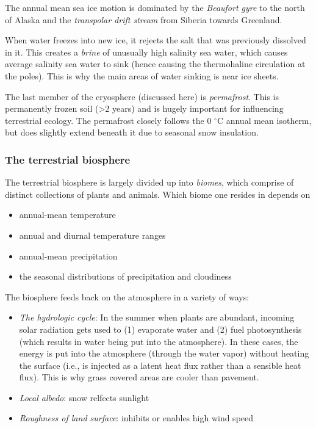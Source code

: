 \documentclass[11pt]{article}
\numberwithin{equation}{section}
\begin{document}
The annual mean sea ice motion is dominated by the \textit{Beaufort gyre} to the north of Alaska and the \textit{transpolar drift stream} from Siberia towards Greenland.

When water freezes into new ice, it rejects the salt that was previously dissolved in it. This creates a \textit{brine} of unusually high salinity sea water, which causes average salinity sea water to sink (hence causing the thermohaline circulation at the poles). This is why the main areas of water sinking is near ice sheets.

The last member of the cryosphere (discussed here) is \textit{permafrost}. This is permanently frozen soil (>2 years) and is hugely important for influencing terrestrial ecology. The permafrost closely follows the 0 $^\circ$C annual mean isotherm, but does slightly extend beneath it due to seasonal snow insulation.

\subsubsection{The terrestrial biosphere}
The terrestrial biosphere is largely divided up into \textit{biomes}, which comprise of distinct collections of plants and animals. Which biome one resides in depends on 
\begin{itemize}
\item annual-mean temperature
\item annual and diurnal temperature ranges
\item annual-mean precipitation 
\item the seasonal distributions of precipitation and cloudiness 
\end{itemize}

The biosphere feeds back on the atmosphere in a variety of ways:
\begin{itemize}
\item \textit{The hydrologic cycle}: In the summer when plants are abundant, incoming solar radiation gets used to (1) evaporate water and (2) fuel photosynthesis (which results in water being put into the atmosphere). In these cases, the energy is put into the atmosphere (through the water vapor) without heating the surface (i.e., is injected as a latent heat flux rather than a sensible heat flux). This is why grass covered areas are cooler than pavement.
\item \textit{Local albedo}: snow relfects sunlight
\item \textit{Roughness of land surface}: inhibits or enables high wind speed
\end{itemize}
\end{document}
